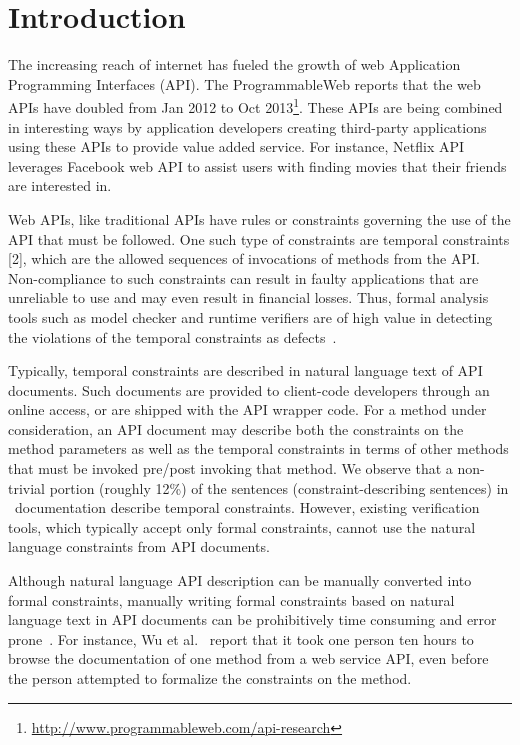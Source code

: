 \section{Introduction}
\label{sec:introduction}

The increasing reach of internet has fueled the growth of web
Application Programming Interfaces (API). The ProgrammableWeb
reports that the web APIs have doubled from Jan 2012 to Oct 2013\footnote{\url{http://www.programmableweb.com/api-research}}.
These APIs are being combined in interesting ways by
application developers creating third-party applications using
these APIs to provide
value added service. For instance, Netflix API leverages Facebook
web API to assist users with finding movies that their friends are
interested in.

Web APIs, like traditional APIs have rules or constraints governing
the use of the API that must be followed. One such type of
constraints are temporal constraints [2], which are the allowed sequences
of invocations of methods from the API. Non-compliance
to such constraints can result in faulty applications that are unreliable
to use and may even result in financial losses. Thus, formal
analysis tools such as model checker and runtime verifiers are of
high value in detecting the violations of the temporal constraints as
defects~\cite{lee2012towards}.


Typically, temporal constraints are described in natural language text of API documents.
Such documents are provided to client-code developers through an online access, or are shipped with the API wrapper code.
For a method under consideration, an API document may describe both the constraints on the method parameters
as well as the temporal constraints in terms of other methods that must be invoked pre/post invoking that method.
We observe that a non-trivial portion (roughly 12\%) of the sentences (constraint-describing sentences)
in \amazonAPI\ documentation describe temporal constraints.
However, existing verification tools, which typically accept only formal constraints,
cannot use the natural language constraints from API documents.

Although natural language API description can be manually converted into formal constraints,
manually writing formal constraints based on natural language text in API documents can be prohibitively time consuming and error prone~\cite{wu2013inferring,RubingerWEB10}. 
For instance, Wu et al.~\cite{wu2013inferring} report that it took one person ten hours to browse the documentation of one method from a web service API, even before the person attempted to formalize the constraints on the method.


